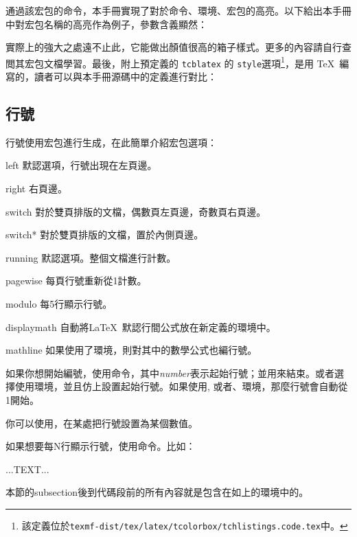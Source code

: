 通過該宏包的命令，本手冊實現了對於命令、環境、宏包的高亮。以下給出本手冊中對宏包名稱的高亮作為例子，參數含義顯然：

實際上的強大之處遠不止此，它能做出顏值很高的箱子樣式。更多的內容請自行查閲其宏包文檔學習。最後，附上預定義的 \texttt{tcblatex} 的 \texttt{style}選項\footnote{該定義位於\texttt{texmf-dist/tex/latex/tcolorbox/tchlistings.code.tex}中。}，是用 \TeX\ 編寫的，讀者可以與本手冊源碼中的定義進行對比：
\begin{latex}
\end{latex}


\subsection{行號}
\begin{linenumbers}
\modulolinenumbers[3]
行號使用宏包進行生成，在此簡單介紹宏包選項：
\begin{para}
  \item[left]默認選項，行號出現在左頁邊。
  \item[right]右頁邊。
  \item[switch]對於雙頁排版的文檔，偶數頁左頁邊，奇數頁右頁邊。
  \item[switch*]對於雙頁排版的文檔，置於內側頁邊。
  \item[running]默認選項。整個文檔進行計數。
  \item[pagewise]每頁行號重新從1計數。
  \item[modulo]每5行顯示行號。
  \item[displaymath]自動將\LaTeX\ 默認行間公式放在新定義的環境中。
  \item[mathline]如果使用了環境，則對其中的數學公式也編行號。
\end{para}

如果你想開始編號，使用命令，其中\textit{number}表示起始行號；並用來結束。或者選擇使用環境，並且仿上設置起始行號。如果使用, 或者、環境，那麼行號會自動從1開始。

你可以使用，在某處把行號設置為某個數值。

如果想要每N行顯示行號，使用命令。比如：
\end{linenumbers}

\begin{latex}
\begin{linenumbers}
    \modulolinenumbers[3]
    ...TEXT...
\end{linenumbers}
\end{latex}

本節的subsection後到代碼段前的所有內容就是包含在如上的環境中的。